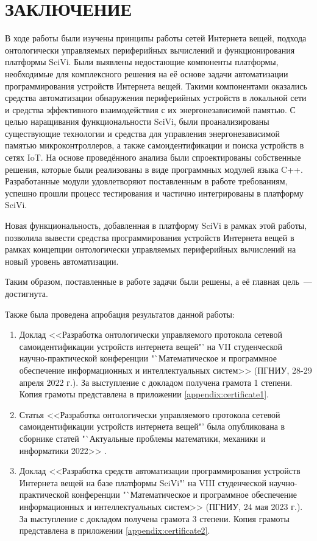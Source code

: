 \chapter*{ЗАКЛЮЧЕНИЕ}

В ходе работы были изучены принципы работы сетей Интернета вещей, подхода онтологически управляемых периферийных вычислений и функционирования платформы SciVi. Были выявлены недостающие компоненты платформы, необходимые для комплексного решения на её основе задачи автоматизации программирования устройств Интернета вещей. Такими компонентами оказались средства автоматизации обнаружения периферийных устройств в локальной сети и средства эффективного взаимодействия с их энергонезависимой памятью.
С целью наращивания функциональности SciVi, были проанализированы существующие технологии и средства для управления энергонезависимой памятью микроконтроллеров, а также самоидентификации и поиска устройств в сетях IoT.
На основе проведённого анализа были спроектированы собственные решения, которые были реализованы в виде программных модулей языка C++.
Разработанные модули удовлетворяют поставленным в работе требованиям, успешно прошли процесс тестирования и частично интегрированы в платформу SciVi.

Новая функциональность, добавленная в платформу SciVi в рамках этой работы, позволила вывести средства программирования устройств Интернета вещей в рамках концепции онтологически управляемых периферийных вычислений на новый уровень автоматизации.

Таким образом, поставленные в работе задачи были решены, а её главная цель~--- достигнута.

Также была проведена апробация результатов данной работы:
\begin{enumerate}
	\item Доклад <<Разработка онтологически управляемого протокола сетевой самоидентификации устройств интернета вещей"' на VII студенческой научно-практической конференции "`Математическое и программное обеспечение информационных и интеллектуальных систем>> (ПГНИУ, 28-29 апреля 2022 г.).
	За выступление с докладом получена грамота 1 степени. Копия грамоты представлена в приложении \ref{appendix:certificate1}.
	\item Статья <<Разработка онтологически управляемого протокола сетевой самоидентификации устройств интернета вещей"' была опубликована в сборнике статей "`Актуальные проблемы математики, механики и информатики 2022>> \cite{incollection:odec-self-id-protocol}.
	\item Доклад <<Разработка средств автоматизации программирования устройств Интернета вещей на базе платформы SciVi"' на VIII студенческой научно-практической конференции "`Математическое и программное обеспечение информационных и интеллектуальных систем>> (ПГНИУ, 24 мая 2023 г.).
	За выступление с докладом получена грамота 3 степени. Копия грамоты представлена в приложении \ref{appendix:certificate2}.
\end{enumerate}
